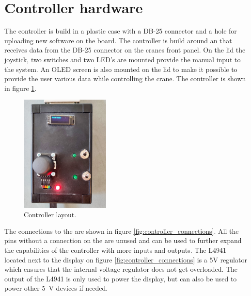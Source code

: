 \section{Controller hardware}

The controller is build in a plastic case with a DB-25 connector and a hole for uploading new software on the board. The controller is build around an \amega that receives data from the DB-25 connector on the cranes front panel. On the lid the joystick, two switches and two LED's are mounted provide the manual input to the system. An OLED screen is also mounted on the lid to make it possible to provide the user various data while controlling the crane. The controller is shown in figure \ref{fig:pic_of_controller}.

\begin{figure}[H]
    \centering
    \includegraphics[width=0.4\textwidth]{pictures/manualController2Beskaaret.jpg}
    \caption{Controller layout.}
    \label{fig:pic_of_controller}
\end{figure}

The connections to the \amega are shown in figure \ref{fig:controller_connections}. All the pins without a connection on the \amega are unused and can be used to further expand the capabilities of the controller with more inputs and outputs. The L4941 located next to the display on figure \ref{fig:controller_connections} is a 5V regulator which ensures that the \amega internal voltage regulator does not get overloaded. The output of the L4941 is only used to power the display, but can also be used to power other \SI{5}{V} devices if needed.

